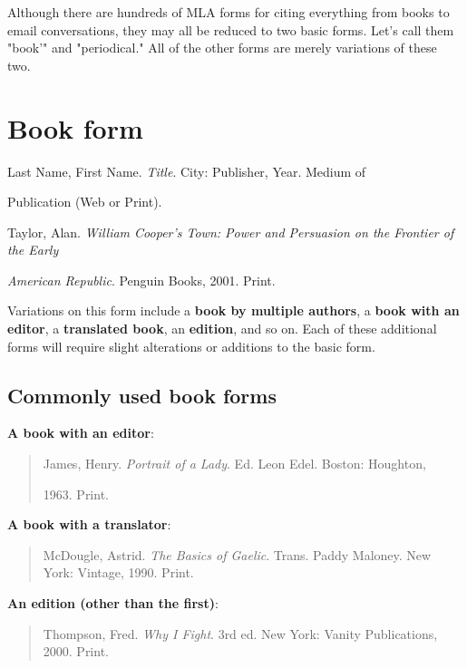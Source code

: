 \newpage




										                

Although there are hundreds of MLA forms for citing everything from books to email 
conversations, they may all be reduced to two basic forms. Let's call them "book'" and 
"periodical." All of the other forms are merely variations of these two.

\section{Book form}



Last Name, First Name. \emph{Title}. City: Publisher, Year. Medium of 

\hspace{.4in}Publication (Web or Print).
\medskip

Taylor, Alan. \emph{William Cooper's Town: Power and Persuasion on the Frontier of the 
Early} 

\hspace{.4in}\emph{American Republic}. Penguin Books, 2001. Print.
\medskip

Variations on this form include a \textbf{book by multiple authors}, a \textbf {book with 
an editor}, a \textbf {translated book}, an \textbf {edition}, and so on. Each of these 
additional forms will require slight alterations or additions to the basic form. 

\subsection{Commonly used book forms}

\textbf{A book with an editor}: 
\begin{quote}
James, Henry. \emph{Portrait of a Lady}. Ed. Leon Edel. Boston: Houghton,

\hspace{.4in}1963. Print.
\end{quote}

\textbf{A book with a translator}: 
\begin{quote}
McDougle, Astrid. \emph{The Basics of Gaelic}. Trans. Paddy Maloney. New  York: 
Vintage, 1990. Print.
\end{quote}


\textbf{An edition (other than the first)}:
\begin{quote}
Thompson, Fred. \emph{Why I Fight}. 3rd ed. New York: Vanity Publications,  2000. Print.
\end{quote}

